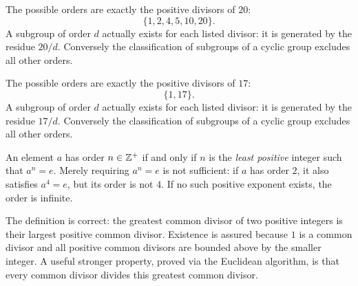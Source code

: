
The possible orders are exactly the positive divisors of $20$:
\[\{1,2,4,5,10,20\}.
\]
A subgroup of order $d$ actually exists for each listed divisor: it is generated by the residue $20/d$. Conversely the classification of subgroups of a cyclic group excludes all other orders.


The possible orders are exactly the positive divisors of $17$:
\[\{1,17\}.
\]
A subgroup of order $d$ actually exists for each listed divisor: it is generated by the residue $17/d$. Conversely the classification of subgroups of a cyclic group excludes all other orders.


An element $a$ has order $n\in\mathbb{Z}^+$ if and only if $n$ is the \emph{least positive} integer such that $a^n=e$. Merely requiring $a^n=e$ is not sufficient: if $a$ has order $2$, it also satisfies $a^4=e$, but its order is not $4$. If no such positive exponent exists, the order is infinite.


The definition is correct: the greatest common divisor of two positive integers is their largest positive common divisor. Existence is assured because $1$ is a common divisor and all positive common divisors are bounded above by the smaller integer. A useful stronger property, proved via the Euclidean algorithm, is that every common divisor divides this greatest common divisor.


